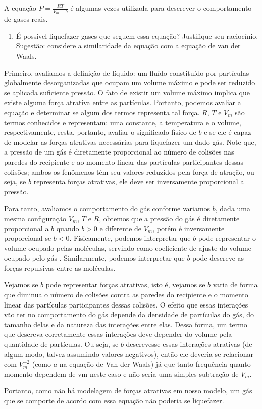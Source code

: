 \begin{xcs}
    A equação \( P = \frac{RT}{V_m - b} \) é algumas vezes utilizada para
    descrever o comportamento de gases reais. 
    \begin{enumerate}[label=\alph*.]
        \item É possível liquefazer gases que seguem essa equação? Justifique
            seu raciocínio. Sugestão: considere a similaridade da equação com a
            equação de van der Waals. 
    \end{enumerate}
\end{xcs}
\begin{rsl}
    Primeiro, avaliamos a definição de líquido: um fluído constituído por
    partículas globalmente desorganizadas que ocupam um volume máximo e pode
    ser reduzido se aplicada suficiente pressão. O fato de existir um volume
    máximo implica que existe alguma força atrativa entre as partículas.
    Portanto, podemos avaliar a equação e determinar se algum dos termos
    representa tal força. $R$, $T$ e $V_m$ são termos conhecidos e 
    representam: uma constante, a temperatura e o volume, respectivamente, resta, portanto,
    avaliar o significado físico de $b$ e se ele é capaz de modelar as forças atrativas necessárias para liquefazer um dado gás. Note que, a pressão de um gás é diretamente proporcional ao número de colisões nas paredes do recipiente e ao momento linear das partículas participantes dessas colisões; ambos os fenômenos têm seu valores reduzidos pela força de atração, ou seja, se $b$ representa forças atrativas, ele deve ser inversamente proporcional a pressão. 
    
    Para tanto, avaliamos o comportamento do gás conforme variamos $b$, dada uma mesma configuração $V_m$, $T$ e
    $R$, obtemos que a pressão do gás é diretamente proporcional a $b$ quando $b>0$ e diferente de $V_m$, porém é inversamente proporcional se $b<0$. Fisicamente, podemos interpretar que $b$ pode representar o volume ocupado pelas moléculas, servindo como coeficiente de ajuste do volume ocupado pelo gás . Similarmente, podemos interpretar que $b$ pode descreve as forças repulsivas entre as moléculas.
    
    Vejamos se \( b \) pode representar forças atrativas, isto é, vejamos se \(
    b\) varia de forma que diminua o número de colisões contra as paredes do
    recipiente e o momento linear das partículas participantes dessas colisões.
     O efeito que essas interações vão
    ter no comportamento do gás depende da densidade de partículas do gás, do tamanho
    delas e da natureza das interações entre elas. Dessa forma, um termo
    que descreva corretamente essas interações deve depender do volume pela
    quantidade de partículas. Ou seja, se \( b \) descrevesse essas interações
    atrativas (de algum modo, talvez assumindo valores negativos),
    então ele deveria se relacionar com \(
    V_m^{-2}\) (como \( a \) na equação de Van der Waals) já que tanto frequência quanto momento dependem de vm neste caso e não seria uma
    simples subtração de \( V_m \).
    
    Portanto, como não há modelagem de forças atrativas em nosso modelo, um gás 
    que se comporte de acordo com essa equação não poderia se liquefazer.
\end{rsl}
